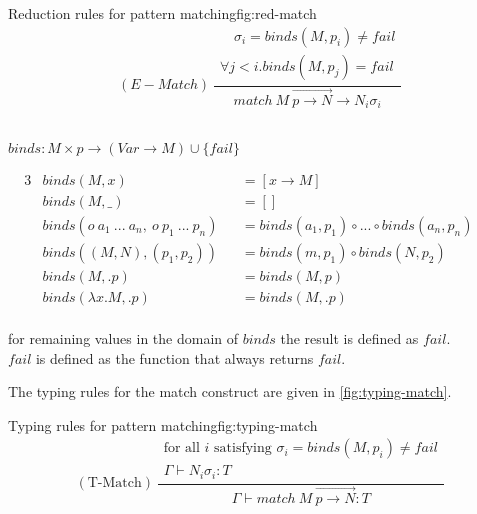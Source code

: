 \begin{myfigure}{Reduction rules for pattern matching}{fig:red-match}
    \[
        (E-Match) \ \frac{
            \begin{gathered}
                \quad \sigma_i = binds(M,p_i) \neq fail\\
                \forall j < i.binds(M,p_j) = fail
            \end{gathered}
        }
        {match \ M \ \overrightarrow{p \rightarrow N} \rightarrow N_i \sigma_i }
    \]
    \\
    \begin{center}
        $binds : M \times p \rightarrow (Var \rightarrow M) \cup \{ fail \}$
    \end{center}
    \begin{alignat*}{3}
         & binds(M,x)                                        &  & = [x \rightarrow M]                              &  & \\
         & binds(M,\_)                                       &  & = []                                             &  & \\
         & binds(o \ a_1 \ ... \ a_n, \ o \ p_1 \ ... \ p_n) &  & = binds(a_1,p_1) \circ ... \circ binds(a_n, p_n) &  & \\
         & binds((M,N),(p_1,p_2))                            &  & = binds(m,p_1) \circ binds(N,p_2)                &  & \\
         & binds(M,.p)                                       &  & = binds(M,p)                                     &  & \\
         & binds(\lambda x.M,.p)                             &  & = binds(M,.p)                                    &  & \\
    \end{alignat*}
    \begin{center}
        for remaining values in the domain of $binds$ the result is defined as $fail$.\\
        $fail$ is defined as the function that always returns $fail$.
    \end{center}
\end{myfigure}

The typing rules for the match construct are given in \cref{fig:typing-match}.

\begin{myfigure}{Typing rules for pattern matching}{fig:typing-match}
    \[
        (\text{T-Match}) \ \frac{
            \begin{gathered}
                \text{for all } i \text{ satisfying } \sigma_i = binds(M,p_i) \neq fail\\
                \Gamma \vdash N_i\sigma_i:T
            \end{gathered}
        }
        {\Gamma \vdash match \ M \ \overrightarrow{p \rightarrow N} : T}
    \]
\end{myfigure}


